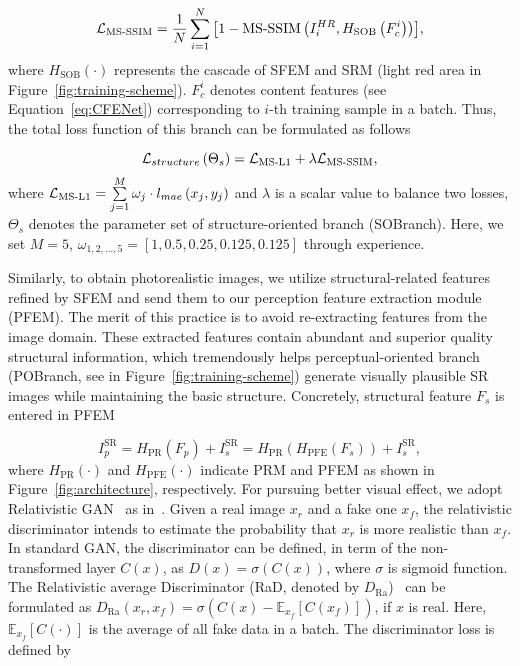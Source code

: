 \documentclass[preprint]{elsarticle}
\begin{document}
\begin{equation}\label{eq:MS-SSIM-loss}
{{\cal L}_\text{MS-SSIM}} = \frac{1}{N}\sum\limits_{i = 1}^N {\left[ {1 - \text{MS-SSIM}\left( {I_i^{HR},{H_\text{SOB}}\left( {F_c^i} \right)} \right)} \right]} ,
\end{equation}
where ${H_\text{SOB}}\left(  \cdot  \right)$ represents the cascade of SFEM and SRM (light red area in Figure~\ref{fig:training-scheme}). $F_c^i$ denotes content features (see Equation~\ref{eq:CFENet}) corresponding to $i$-th training sample in a batch. Thus, the total loss function of this branch can be formulated as follows

\begin{equation}\label{eq:structure-loss}
{{\cal L}_{structure}\left(\Theta_s \right)} = {{\cal L}_\text{MS-L1}} + \lambda {{\cal L}_\text{MS-SSIM}} ,	
\end{equation}
where ${{\cal L}_\text{MS-L1}} = \sum\limits_{j = 1}^M {{\omega _j} \cdot {l_{mae}}\left( {{x_j},{y_j}} \right)} $ and $ \lambda$ is a scalar value to balance two losses, $\Theta_s$ denotes the parameter set of structure-oriented branch (SOBranch). Here, we set $M = 5$, ${\omega_{1,2,...,5}} = [1, 0.5, 0.25, 0.125, 0.125]$ through experience.

Similarly, to obtain photorealistic images, we utilize structural-related features refined by SFEM and send them to our perception feature extraction module (PFEM). The merit of this practice is to avoid re-extracting features from the image domain. These extracted features contain abundant and superior quality structural information, which tremendously helps perceptual-oriented branch (POBranch, see in Figure~\ref{fig:training-scheme}) generate visually plausible SR images while maintaining the basic structure. Concretely, structural feature $F_s$ is entered in PFEM

\begin{equation}\label{eq:po-branch}
I_p^\text{SR} = {H_\text{PR}}\left( {{F_p}} \right) + I_s^\text{SR} = {H_\text{PR}}\left( {{H_\text{PFE}}\left( {{F_s}} \right)} \right) + I_s^\text{SR} ,
\end{equation}
where ${H_\text{PR}}\left( \cdot \right)$ and ${{H_\text{PFE}}\left( \cdot \right)}$ indicate PRM and PFEM as shown in Figure~\ref{fig:architecture}, respectively. For pursuing better visual effect, we adopt Relativistic GAN~\cite{RaSGAN} as in~\cite{ESRGAN}. Given a real image ${x_r}$ and a fake one ${x_f}$, the relativistic discriminator intends to estimate the probability that ${x_r}$ is more realistic than ${x_f}$. In standard GAN, the discriminator can be defined, in term of the non-transformed layer ${C\left( x \right)}$, as $D\left( x \right) = \sigma \left( {C\left( x \right)} \right)$, where $\sigma$ is sigmoid function. The Relativistic average Discriminator (RaD, denoted by $D_\text{Ra}$)~\cite{RaSGAN} can be formulated as ${D_\text{Ra}}\left( {{x_r},{x_f}} \right) = \sigma \left( {C\left( x \right) - {\mathbb{E}_{{x_f}}}\left[ {C\left( {{x_f}} \right)} \right]} \right)$, if $x$ is real. Here, ${{\mathbb{E}_{{x_f}}}\left[ {C\left( \cdot \right)} \right]}$ is the average of all fake data in a batch. The discriminator loss is defined by
\end{document}
